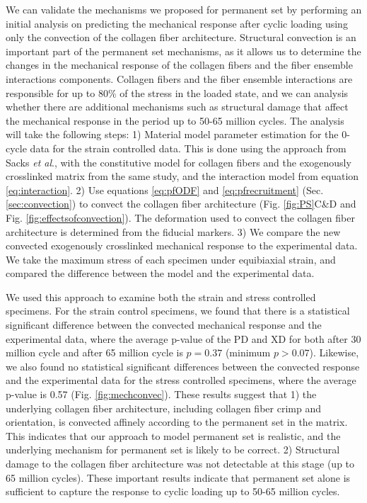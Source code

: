 	We can validate the mechanisms we proposed for permanent set by performing an initial analysis on predicting the mechanical response after cyclic loading using only the convection of the collagen fiber architecture. 
	Structural convection is an important part of the permanent set mechanisms, as it allows us to determine the changes in the mechanical response of the collagen fibers and the fiber ensemble interactions components. 
	Collagen fibers and the fiber ensemble interactions are responsible for up to 80\% of the stress in the loaded state, and we can analysis whether there are additional mechanisms such as structural damage that affect the mechanical response in the period up to 50-65 million cycles. 
	The analysis will take the following steps: 1) Material model parameter estimation for the 0-cycle data for the strain controlled data. 
	This is done using the approach from Sacks \textit{et al}.\cite{sacks_novel_2016}, with the constitutive model for collagen fibers and the exogenously crosslinked matrix from the same study, and the interaction model from equation \ref{eq:interaction}. 
	2) Use equations \ref{eq:pfODF} and \ref{eq:pfrecruitment} (Sec.\ref{sec:convection}) to convect the collagen fiber architecture (Fig. \ref{fig:PS}C\&D and Fig. \ref{fig:effectsofconvection}). 
	The deformation used to convect the collagen fiber architecture is determined from the fiducial markers. 
	3) We compare the new convected exogenously crosslinked mechanical response to the experimental data. 
	We take the maximum stress of each specimen under equibiaxial strain, and compared the difference between the model and the experimental data. 


	We used this approach to examine both the strain and stress controlled specimens. 
	For the strain control specimens, we found that there is a statistical significant difference between the convected mechanical response and the experimental data, where the average p-value of the PD and XD for both after 30 million cycle and after 65 million cycle is $p = 0.37$ (minimum $p > 0.07$). 
	Likewise, we also found no statistical significant differences between the convected response and the experimental data for the stress controlled specimens, where the average p-value is 0.57 (Fig. \ref{fig:mechconvec}).
	These results suggest that 1) the underlying collagen fiber architecture, including collagen fiber crimp and orientation, is convected affinely according to the permanent set in the matrix. This indicates that our approach to model permanent set is realistic, and the underlying mechanism for permanent set is likely to be correct. 
	2) Structural damage to the collagen fiber architecture was not detectable at this stage (up to 65 million cycles). 
	These important results indicate that permanent set alone is sufficient to capture the response to cyclic loading up to 50-65 million cycles. 


